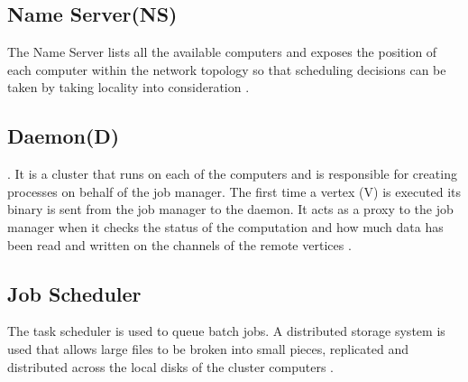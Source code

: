 \documentclass[9pt,twocolumn,twoside]{../../styles/osajnl}
\begin{document}
\subsection{Name Server(NS)} 
The Name Server lists all the available computers and exposes the position of each computer within the network topology so that scheduling decisions can be taken by taking locality into consideration \cite{DryadMSR2}.
\subsection{Daemon(D)}.
It is a cluster that runs on each of the computers and is responsible for creating processes on behalf of the job manager. The first time a vertex (V) is executed its binary is sent from the job manager to the daemon. It acts as a proxy to the job manager when it checks the status of the computation and how much data has been read and written on the channels of the remote vertices \cite{DryadMSR2}.
\subsection{Job Scheduler}
The task scheduler is used to queue batch jobs. A distributed storage system is used that allows large files to be broken into small pieces, replicated and distributed across the local disks of the cluster computers \cite{DryadMSR2}.
\end{document}
